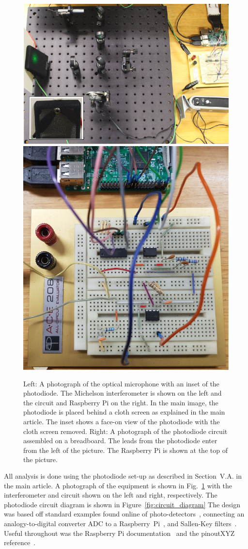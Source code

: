 \documentclass[aps,pra,superscriptaddress,reprint]{revtex4-2}
\begin{document}
\begin{figure}
	\includegraphics[height=0.41\textwidth]{figures/setup_pic2.pdf}
	\includegraphics[height=0.41\textwidth]{figures/circuit_pic3.pdf}
	\caption{
Left: A photograph of the optical microphone with an inset of the photodiode. The Michelson interferometer is shown on the left and the circuit and Raspberry Pi on the right. In the main image, the photodiode is placed behind a cloth screen as explained in the main article. The inset shows a face-on view of the photodiode with the cloth screen removed. 
Right: A photograph of the photodiode circuit assembled on a breadboard. The leads from the photodiode enter from the left of the picture. The Raspberry Pi is shown at the top of the picture.
}
	\label{fig:photographs_of_optical_microphone_and_circuit}
\end{figure}


All analysis is done using the photodiode set-up as described in Section~V.A. in the main article. 
A photograph of the equipment is shown in Fig.~\ref{fig:photographs_of_optical_microphone_and_circuit} with the interferometer and circuit shown on the left and right, respectively. 
The photodiode circuit diagram is shown in Figure~\ref{fig:circuit_diagram}
The design was based off standard examples found online of photo-detectors~\cite{photodiodecircuits1:online,photodiodecircuits2:online}, connecting an analogy-to-digital converter ADC to a Raspberry~Pi~\cite{piadcguide:online}, and Sallen-Key filters~\cite{sallenkey1:online,sallenkey2:online}. Useful throughout was the Raspberry Pi documentation~\cite{pidocumentation:online} and the pinoutXYZ reference~\cite{pipinout:online}.
\end{document}
